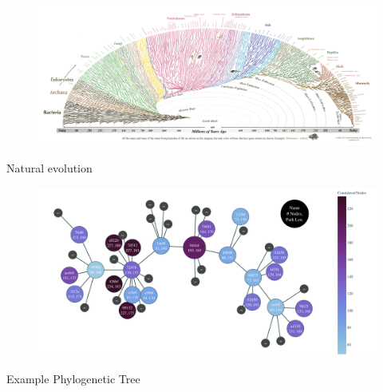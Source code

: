\documentclass[aspectratio=169]{beamer}
\begin{document}
\begin{frame}[plain]
  \begin{figure}
  \vspace*{-2em}
  \hspace*{-3em}
  \centering
  \includegraphics[width=1.17\linewidth,keepaspectratio]{figures/tree_of_life.png}
  \end{figure}
  {\color{pureminimalistic@text@red} \Huge Natural evolution}
\end{frame}

\begin{frame}[plain]
  \begin{figure}
  \centering
  \includegraphics[width=1.0\linewidth,keepaspectratio]{figures/mutation_tree_starcraft_enigma_nsga2.pdf}
  \end{figure}
  {\color{pureminimalistic@text@red} \Huge Example Phylogenetic Tree}
\end{frame}
\end{document}
